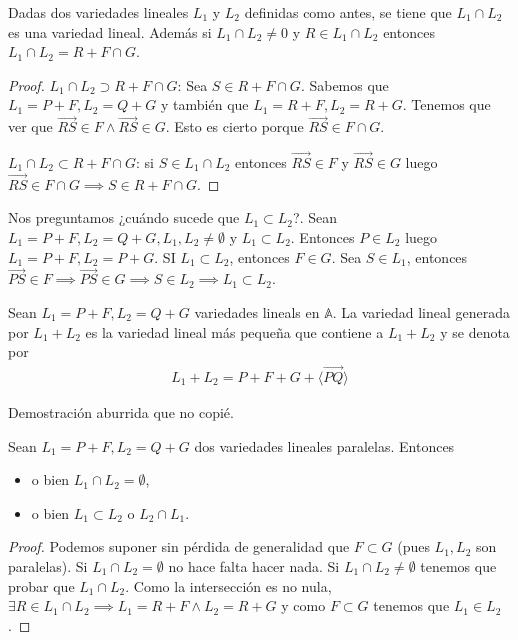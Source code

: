 \documentclass[14pt]{book}
\begin{document}
\begin{pro}
	Dadas dos variedades lineales $L_1$ y $L_2$ definidas como antes, se tiene que $L_1 \cap L_2$ es una variedad lineal. Además si $L_1 \cap L_2 ≠ 0$ y $R \in L_1 \cap L_2$ entonces $L_1 \cap L_2 = R + F \cap G$.
\end{pro}
\begin{proof}
	$L_1 \cap L_2 \supset R + F \cap G$: Sea $S \in R + F \cap G$. Sabemos que $L_1 = P + F, L_2 = Q + G$ y también que $L_1 = R + F, L_2 = R + G$. Tenemos que ver que $\overrightarrow{RS} \in F \land \overrightarrow{RS} \in G$. Esto es cierto porque $\overrightarrow{RS} \in F \cap G$.
	
	$L_1 \cap L_2 \subset R + F \cap G$: si $S \in L_1 \cap L_2$ entonces $\overrightarrow{RS} \in F$ y $\overrightarrow{RS} \in G$ luego $\overrightarrow{RS} \in F \cap G \implies S \in R + F \cap G$.
\end{proof}

Nos preguntamos ¿cuándo sucede que $L_1 \subset L_2$?. Sean $L_1 = P+F, L_2 = Q+G, L_1, L_2 ≠ \emptyset$ y $L_1 \subset L_2$. Entonces $P \in L_2$ luego $L_1 = P + F, L_2 = P + G$. SI $L_1 \subset L_2$, entonces $F \in G$. Sea $S \in L_1$, entonces $\overrightarrow{PS} \in F \implies \overrightarrow{PS} \in G \implies S \in L_2 \implies L_1 \subset L_2$.

\begin{pro}
	Sean $L_1 = P + F, L_2 = Q + G$ variedades lineals en $\mathbb{A}$. La variedad lineal generada por $L_1 + L_2$ es la variedad lineal más pequeña que contiene a $L_1 + L_2$ y se denota por
	\begin{align*}
		L_1  + L_2 = P + F + G + \langle \overrightarrow{PQ} \rangle
	\end{align*}
\end{pro}

Demostración aburrida que no copié.

\begin{pro}
	Sean $L_1 = P + F, L_2 = Q + G$ dos variedades lineales paralelas. Entonces
	\begin{itemize}
		\item o bien $L_1 \cap L_2 = \emptyset$,
		\item o bien $L_1 \subset L_2$ o $L_2 \cap L_1$.
	\end{itemize}
\end{pro}

\begin{proof}
	Podemos suponer sin pérdida de generalidad que $F \subset G$ (pues $L_1, L_2$ son paralelas). Si $L_1 \cap L_2 = \emptyset$ no hace falta hacer nada. Si $L_1 \cap L_2 ≠ \emptyset$ tenemos que probar que $L_1 \cap L_2$. Como la intersección es no nula, $\exists R \in L_1 \cap L_2 \implies L_1 = R + F \land L_2 = R + G$ y como $F \subset G$ tenemos que $L_1 \in L_2$.
\end{proof}
\end{document}
